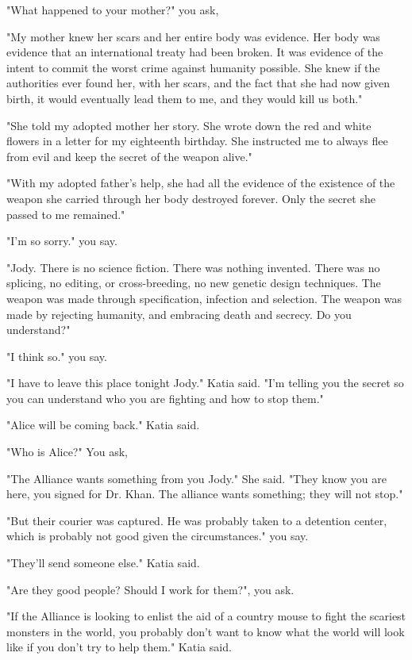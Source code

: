 \documentclass[a5paper, symmetric]{tufte-book}
\begin{document}
"What happened to your mother?" you ask,

"My mother knew her scars and her entire body was evidence. Her body was evidence that an international treaty had been broken. It was evidence of the intent to commit the worst crime against humanity possible. She knew if the authorities ever found her, with her scars, and the fact that she had now given birth, it would eventually lead them to me, and they would kill us both." 

"She told my adopted mother her story. She wrote down the red and white flowers in a letter for my eighteenth birthday. She instructed me to always flee from evil and keep the secret of the weapon alive."

"With my adopted father's help, she had all the evidence of the existence of the weapon she carried through her body destroyed forever. Only the secret she passed to me remained."

"I'm so sorry." you say.  

"Jody. There is no science fiction. There was nothing invented. There was no splicing, no editing, or cross-breeding, no new genetic design techniques. The weapon was made through specification, infection and selection. The weapon was made by rejecting humanity, and embracing death and secrecy. Do you understand?" 

"I think so." you say. 

"I have to leave this place tonight Jody." Katia said. "I'm telling you the secret so you can understand who you are fighting and how to stop them." 

"Alice will be coming back." Katia said. 

"Who is Alice?" You ask, 

"The Alliance wants something from you Jody." She said. "They know you are here, you signed for Dr. Khan. The alliance wants something; they will not stop." 

"But their courier was captured. He was probably taken to a detention center, which is probably not good given the circumstances." you say. 

"They'll send someone else." Katia said. 

"Are they good people? Should I work for them?", you ask. 

"If the Alliance is looking to enlist the aid of a country mouse to fight the scariest monsters in the world, you probably don't want to know what the world will look like if you don't try to help them." Katia said. 
\end{document}
